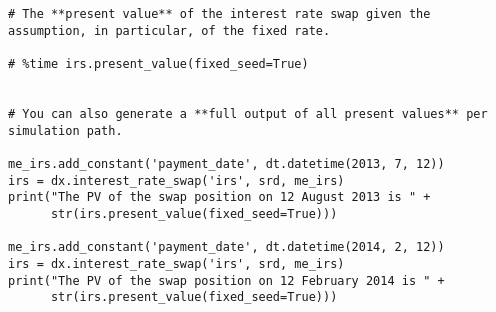 \documentclass[a4paper, 11pt]{article}
\begin{document}
\begin{lstlisting}
# The **present value** of the interest rate swap given the assumption, in particular, of the fixed rate.

# %time irs.present_value(fixed_seed=True)


# You can also generate a **full output of all present values** per simulation path.

me_irs.add_constant('payment_date', dt.datetime(2013, 7, 12))
irs = dx.interest_rate_swap('irs', srd, me_irs)
print("The PV of the swap position on 12 August 2013 is " +
      str(irs.present_value(fixed_seed=True)))

me_irs.add_constant('payment_date', dt.datetime(2014, 2, 12))
irs = dx.interest_rate_swap('irs', srd, me_irs)
print("The PV of the swap position on 12 February 2014 is " +
      str(irs.present_value(fixed_seed=True)))

\end{lstlisting}


%
%
\end{document}
